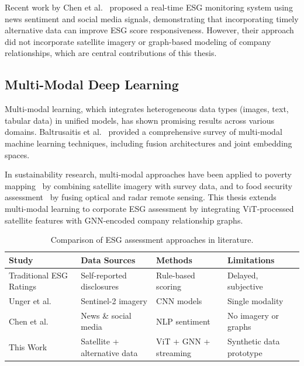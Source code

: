 Recent work by Chen et al.~\cite{chen2021realtime} proposed a real-time ESG monitoring system using news sentiment and social media signals, demonstrating that incorporating timely alternative data can improve ESG score responsiveness. However, their approach did not incorporate satellite imagery or graph-based modeling of company relationships, which are central contributions of this thesis.

\subsection{Multi-Modal Deep Learning}

Multi-modal learning, which integrates heterogeneous data types (images, text, tabular data) in unified models, has shown promising results across various domains. Baltrusaitis et al.~\cite{baltrusaitis2018multimodal} provided a comprehensive survey of multi-modal machine learning techniques, including fusion architectures and joint embedding spaces.

In sustainability research, multi-modal approaches have been applied to poverty mapping~\cite{jean2016poverty} by combining satellite imagery with survey data, and to food security assessment~\cite{kussul2017food} by fusing optical and radar remote sensing. This thesis extends multi-modal learning to corporate ESG assessment by integrating ViT-processed satellite features with GNN-encoded company relationship graphs.

\begin{table}[h!]
\centering
\small
 \begin{tabular}{p{3.5cm} p{3cm} p{2.5cm} p{3cm}}
 \hline
 \textbf{Study} & \textbf{Data Sources} & \textbf{Methods} & \textbf{Limitations} \\ [0.5ex]
 \hline
 Traditional ESG Ratings & Self-reported disclosures & Rule-based scoring & Delayed, subjective \\[0.3ex]
 Unger et al.~\cite{unger2020satellite} & Sentinel-2 imagery & CNN models & Single modality \\[0.3ex]
 Chen et al.~\cite{chen2021realtime} & News \& social media & NLP sentiment & No imagery or graphs \\[0.3ex]
 This Work & Satellite + alternative data & ViT + GNN + streaming & Synthetic data prototype \\ [0.5ex]
 \hline
 \end{tabular}
 \caption{\label{tab:litcomp}Comparison of ESG assessment approaches in literature.}
\end{table}

